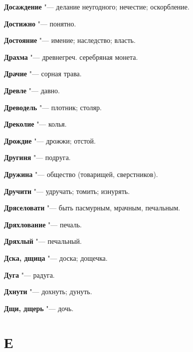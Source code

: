 \begin{mymulticols}{2}
\noindent\textbf{Досаждение} "--- делание неугодного; нечестие; оскорбление. 




\noindent\textbf{Достижно} "--- понятно. 




\noindent\textbf{Достояние} "--- имение; наследство; власть. 




\noindent\textbf{Драхма} "--- древнегреч. серебряная монета. 




\noindent\textbf{Драчие} "--- сорная трава. 




\noindent\textbf{Древле} "--- давно. 




\noindent\textbf{Древодель} "--- плотник; столяр. 




\noindent\textbf{Дреколие} "--- колья. 




\noindent\textbf{Дрождие} "--- дрожжи; отстой. 




\noindent\textbf{Другиня} "--- подруга. 




\noindent\textbf{Дружина} "--- общество (товарищей, сверстников). 




\noindent\textbf{Дручити} "--- удручать; томить; изнурять. 




\noindent\textbf{Дряселовати} "--- быть пасмурным, мрачным, печальным. 




\noindent\textbf{Дряхлование} "--- печаль. 




\noindent\textbf{Дряхлый} "--- печальный. 




\noindent\textbf{Дска, дщица} "--- доска; дощечка. 




\noindent\textbf{Дуга} "--- радуга. 




\noindent\textbf{Дхнути} "--- дохнуть; дунуть. 




\noindent\textbf{Дщи, дщерь} "--- дочь. 




\section{Е}






\end{mymulticols}
